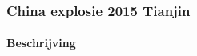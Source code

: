 \documentclass{article}
\begin{document}

	\subsubsection{China explosie 2015 Tianjin}
	\paragraph{Beschrijving}
	
\end{document}
